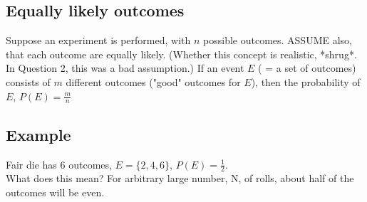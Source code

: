    \subsection*{Equally likely outcomes}
    Suppose an experiment is performed, with $n$ possible outcomes. ASSUME also,
    that each outcome are equally likely. (Whether this concept is realistic,
    *shrug*. In Question 2, this was a bad assumption.) If an event $E$ ( = a
    set of outcomes) consists of $m$ different outcomes ("good" outcomes for
    $E$), then the probability of $E$, $P(E) = \frac{m}{n}$\\

  \subsection*{Example}
    Fair die has 6 outcomes, $E = \{ 2, 4, 6\}$, $P(E) = \frac{1}{2}$.\\
    What does this mean? For arbitrary large number, N, of rolls, about half
    of the outcomes will be even.

